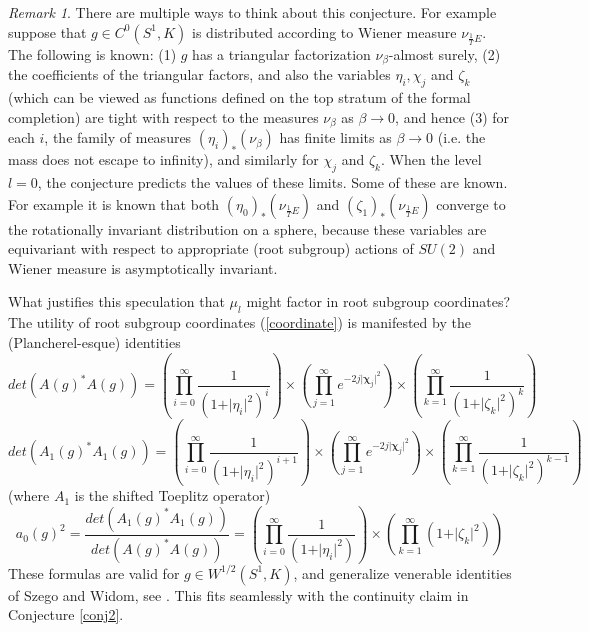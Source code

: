 \documentclass{amsart}
\theoremstyle{conjecture}
\theoremstyle{definition}
\theoremstyle{question}
\theoremstyle{questions}
\theoremstyle{remark}
\newtheorem*{remark}{Remark}
\theoremstyle{remarks}
\theoremstyle{example}
\numberwithin{equation}{section}
\begin{document}
\begin{remark}\label{conjremark} There are multiple ways to think about this conjecture. For example
suppose that $g\in C^0(S^1,K)$ is distributed according to
Wiener measure $\nu_{\frac 1T E}$. The following is known: (1)  $g$ has a triangular factorization $\nu_{\beta}$-almost surely, (2) the coefficients of the triangular factors, and also the variables $\eta_i,\chi_j$ and $\zeta_k$ (which can be viewed as functions defined on the top stratum of the formal completion) are tight with respect to the measures $\nu_{\beta}$ as $\beta\to 0$, and hence (3) for each $i$, the family of measures $(\eta_i)_*(\nu_{\beta})$ has finite limits as $\beta\to 0$ (i.e. the mass does not escape to infinity), and similarly for $\chi_j$ and $\zeta_k$. When the level $l=0$, the conjecture predicts the values of these limits. Some of these are known. For example it is known that both $(\eta_0)_*(\nu_{\frac 1T E})$ and $(\zeta_1)_*(\nu_{\frac 1T E})$ converge to the rotationally invariant distribution on a sphere, because these variables are equivariant with respect to appropriate (root subgroup) actions of $SU(2)$ and Wiener measure is asymptotically invariant. \end{remark}

What justifies this speculation that $\mu_l$ might factor in root subgroup coordinates?
The utility of root subgroup coordinates (\ref{coordinate}) is
manifested by the (Plancherel-esque) identities
\begin{equation}\label{Toeplitz0}det(A(g)^*A(g))=
\left(\prod_{i=0}^{\infty}\frac{1}{(1+\vert\eta_i\vert^2)^{i}}\right)\times
\left(\prod_{
j=1}^{\infty}e^{-2j\vert\mathbf{\chi}_j\vert^2}\right)\times
\left(\prod_{k=1}^{\infty}\frac
{1}{(1+\vert\zeta_k\vert^2)^{k}}\right)\end{equation}
\begin{equation}\label{Toeplitz1}det(A_1(g)^*A_1(g))=
\left(\prod_{i=0}^{\infty}\frac{1}{(1+\vert\eta_i\vert^2)^{i+1}}\right)\times
\left(\prod_{
j=1}^{\infty}e^{-2j\vert\mathbf{\chi}_j\vert^2}\right)\times
\left(\prod_{k=1}^{\infty}\frac
{1}{(1+\vert\zeta_k\vert^2)^{k-1}}\right)\end{equation}
(where $A_1$ is the shifted Toeplitz operator)
\begin{equation}\label{Toeplitzdiag}a_0(g)^2=\frac{det(A_1(g)^*A_1(g)) }{det(A(g)^*A(g))}
=\left(\prod_{i=0}^{\infty}\frac{1}{(1+\vert\eta_i\vert^2)}\right)\times
\left(\prod_{k=1}^{\infty}(1+\vert\zeta_k\vert^2)\right)\end{equation}
These formulas are valid for
$g\in W^{1/2}(S^1,K)$, and generalize venerable identities of Szego and Widom, see \cite{Pi4}.
This fits seamlessly with the continuity claim in Conjecture \ref{conj2}.
\end{document}
